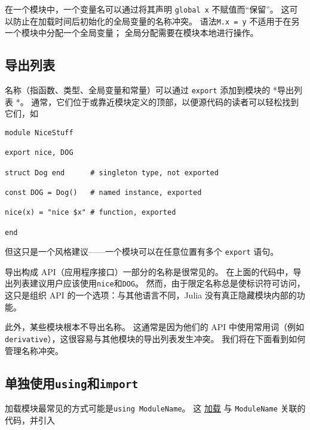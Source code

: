 在一个模块中，一个变量名可以通过将其声明 \texttt{global x} 不赋值而“保留”。 这可以防止在加载时间后初始化的全局变量的名称冲突。 语法\texttt{M.x = y} 不适用于在另一个模块中分配一个全局变量； 全局分配需要在模块本地进行操作。



\hypertarget{2370835204364650501}{}


\subsection{导出列表}



名称（指函数、类型、全局变量和常量）可以通过 \texttt{export} 添加到模块的 *导出列表 *。 通常，它们位于或靠近模块定义的顶部，以便源代码的读者可以轻松找到它们，如




\begin{verbatim}
module NiceStuff

export nice, DOG

struct Dog end      # singleton type, not exported

const DOG = Dog()   # named instance, exported

nice(x) = "nice $x" # function, exported

end
\end{verbatim}



但这只是一个风格建议——一个模块可以在任意位置有多个 \texttt{export} 语句。



导出构成 API（应用程序接口）一部分的名称是很常见的。 在上面的代码中，导出列表建议用户应该使用\texttt{nice}和\texttt{DOG}。 然而，由于限定名称总是使标识符可访问，这只是组织 API 的一个选项：与其他语言不同，Julia 没有真正隐藏模块内部的功能。



此外，某些模块根本不导出名称。 这通常是因为他们的 API 中使用常用词（例如\texttt{derivative}），这很容易与其他模块的导出列表发生冲突。 我们将在下面看到如何管理名称冲突。



\hypertarget{11570243363614655937}{}


\subsection{单独使用\texttt{using}和\texttt{import}}



加载模块最常见的方式可能是\texttt{using ModuleName}。 这 \hyperlink{11949095373261797528}{加载} 与 \texttt{ModuleName} 关联的代码，并引入



